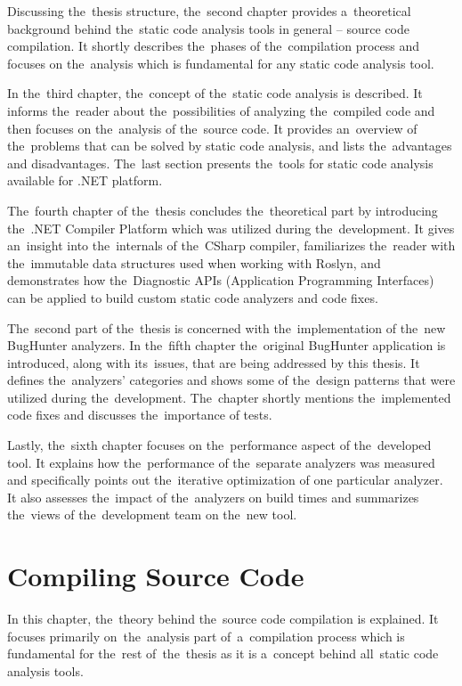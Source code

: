 \documentclass[
  digital, %
  table,   %
  lof,     %
  lot,     %
  oneside,
]{fithesis3}
\begin{document}
Discussing the~thesis structure, the~second chapter provides a~theoretical background behind the~static code analysis tools in general -- source code compilation. It shortly describes the~phases of the~compilation process and focuses on the~analysis which is fundamental for any static code analysis tool.

In the~third chapter, the~concept of the~static code analysis is described. It informs the~reader about the~possibilities of analyzing the~compiled code and then focuses on the~analysis of the~source code. It provides an~overview of the~problems that can be solved by static code analysis, and lists the~advantages and disadvantages. The~last section presents the~tools for static code analysis available for .NET platform.

The~fourth chapter of the~thesis concludes the~theoretical part by introducing the~.NET Compiler Platform which was utilized during the~development. It gives an~insight into the~internals of the~CSharp compiler, familiarizes the~reader with the~immutable data structures used when working with Roslyn, and demonstrates how the~Diagnostic APIs (Application Programming Interfaces) can be applied to build custom static code analyzers and code fixes.

The~second part of the~thesis is concerned with the~implementation of the~new BugHunter analyzers. In the~fifth chapter the~original BugHunter application is introduced, along with its~issues, that are being addressed by this thesis. It defines the~analyzers' categories and shows some of the~design patterns that were utilized during the~development. The~chapter shortly mentions the~implemented code fixes and discusses the~importance of tests.

Lastly, the~sixth chapter focuses on the~performance aspect of the~developed tool. It explains how the~performance of the~separate analyzers was measured and specifically points out the~iterative optimization of one particular analyzer. It also assesses the~impact of the~analyzers on build times and summarizes the~views of the~development team on the~new tool.

\chapter{Compiling Source Code}
\label{chap:compilers}
In this chapter, the~theory behind the~source code compilation is explained. It focuses primarily on~the~analysis part of~a~compilation process which is fundamental for the~rest of~the~thesis as it is a~concept behind all~static code analysis tools.
\end{document}
